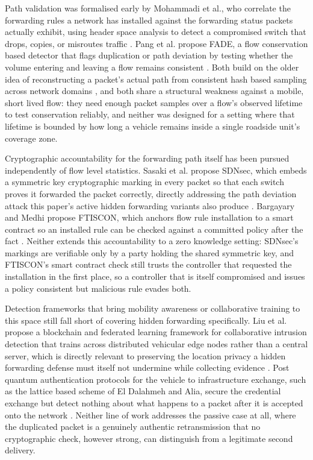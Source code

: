 \documentclass[final,5p,twocolumn]{elsarticle}
\theoremstyle{remark}
\theoremstyle{plain}
\begin{document}
Path validation was formalised early by Mohammadi et al., who correlate the
forwarding rules a network has installed against the forwarding status
packets actually exhibit, using header space analysis to detect a compromised
switch that drops, copies, or misroutes traffic \cite{Mohammadi2016}. Pang
et al. propose FADE, a flow conservation based detector that flags duplication
or path deviation by testing whether the volume entering and leaving a flow
remains consistent \cite{Pang2016FADE}. Both build on the older idea of
reconstructing a packet's actual path from consistent hash based sampling
across network domains \cite{Duffield2001}, and both share a structural
weakness against a mobile, short lived flow: they need enough packet samples
over a flow's observed lifetime to test conservation reliably, and neither
was designed for a setting where that lifetime is bounded by how long a
vehicle remains inside a single roadside unit's coverage zone.

Cryptographic accountability for the forwarding path itself has been pursued
independently of flow level statistics. Sasaki et al. propose SDNsec, which
embeds a symmetric key cryptographic marking in every packet so that each
switch proves it forwarded the packet correctly, directly addressing the path
deviation attack this paper's active hidden forwarding variants also produce
\cite{Sasaki2016SDNsec}. Bargayary and Medhi propose FTISCON, which anchors flow
rule installation to a smart contract so an installed rule can be checked
against a committed policy after the fact \cite{Bargayary2023FTISCON}. Neither
extends this accountability to a zero knowledge setting: SDNsec's markings are
verifiable only by a party holding the shared symmetric key, and FTISCON's
smart contract check still trusts the controller that requested the
installation in the first place, so a controller that is itself compromised
and issues a policy consistent but malicious rule evades both.

Detection frameworks that bring mobility awareness or collaborative training
to this space still fall short of covering hidden forwarding specifically.
Liu et al. propose a blockchain and federated learning framework for
collaborative intrusion detection that trains across distributed vehicular
edge nodes rather than a central server, which is directly relevant to
preserving the location privacy a hidden forwarding defense must itself not
undermine while collecting evidence \cite{Liu2021BFLVEC}. Post quantum
authentication protocols for the vehicle to infrastructure exchange, such as
the lattice based scheme of El Dalahmeh and Alia, secure the credential
exchange but detect nothing about what happens to a packet after it is
accepted onto the network \cite{ElDalahmeh2025}. Neither line of work
addresses the passive case at all, where the duplicated packet is a genuinely
authentic retransmission that no cryptographic check, however strong, can
distinguish from a legitimate second delivery.
\end{document}
